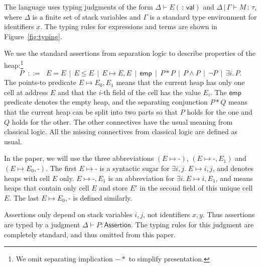 \documentclass{LMCS}
\newcommand{\val}{\mathsf{val}}
\newcommand{\Assert}{\mathsf{Assertion}}
\newcommand{\blank}{\mbox{-}}
\newcommand{\emp}{\mathsf{emp}}
\newcommand{\pointsto}{\mapsto}
\begin{document}
The language uses typing judgments of the form
$\Delta \vdash E (\,{:}\,\val)$ and
$\Delta \,|\, \Gamma \vdash M \,{:}\, \tau$,
where $\Delta$ is a finite set of stack variables
and $\Gamma$ is a standard type environment for identifiers $x$.
The typing rules for expressions and terms are shown in
Figure~\ref{fig:typing}.


We use the standard assertions from separation logic to describe properties
of the heap:\footnote{We omit separating implication $-\!\!*$
to simplify presentation.}
{
$$
P
   \;\;::=\;\;  E = E 
  \,\mid\, E \leq E
  \,\mid\, E \pointsto E,E 
  \,\mid\, \emp
  \,\mid\, P * P
  \,\mid\, P \wedge P
  \,\mid\, \neg P
  \,\mid\, \exists i.\, P.
$$
}
The points-to predicate $E \pointsto E_0,E_1$ means
that the current heap has only one cell at address $E$ and 
that the $i$-th field of the cell has the value $E_i$.
The $\emp$ predicate denotes the empty heap, and the separating
conjunction $P*Q$ means that the current heap can be split into
two parts so that $P$ holds for the one and $Q$ holds for the other.
The other connectives have the usual meaning from classical logic.
All the missing connectives from classical logic are defined as usual. 

In the paper, we will use the three abbreviations 
$(E \pointsto \blank)$, $(E \pointsto \blank, E_1)$
and $(E \pointsto E_0,\blank)$. The first
$E \pointsto \blank$ is a syntactic sugar for 
$\exists i,j.\; E \pointsto i,j$, and denotes heaps
with cell $E$ only.
$E\pointsto \blank,E_1$ is an abbreviation for
$\exists i.\,E\pointsto i,E_1$, and means
 heaps that contain only cell $E$ and
store $E'$ in the second field of this unique cell $E$.
The last $E\pointsto E_0,\blank$ is defined similarly.

Assertions only depend on stack variables $i,j$, not identifiers $x,y$.
Thus assertions are typed by a judgment $\Delta \vdash P :
\Assert$.  The typing rules for this judgment are completely standard, and
thus omitted from this paper.
\end{document}

